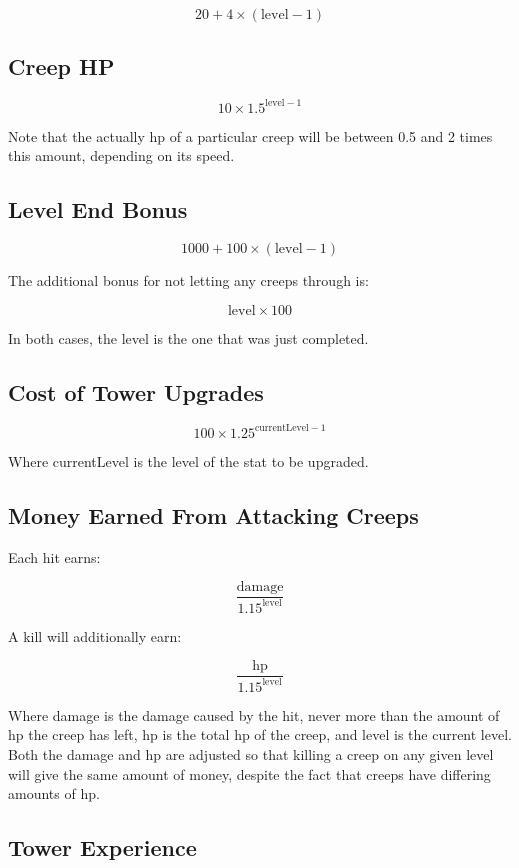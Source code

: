 \documentclass[a4paper,11pt]{article}
\begin{document}
\[20 + 4 \times \left( \mathrm{level} - 1 \right)\]

\subsection{Creep HP}

\[10 \times 1.5^{\mathrm{level} - 1}\]

Note that the actually hp of a particular creep will be between 0.5 and 2 times this amount, depending on its speed.

\subsection{Level End Bonus}

\[1000 + 100 \times \left( \mathrm{level} - 1 \right)\]

The additional bonus for not letting any creeps through is:

\[\mathrm{level} \times 100\]

In both cases, the level is the one that was just completed.

\subsection{Cost of Tower Upgrades}

\[100 \times 1.25^{\mathrm{currentLevel} - 1}\]

Where currentLevel is the level of the stat to be upgraded.

\subsection{Money Earned From Attacking Creeps}

Each hit earns:

\[\frac{\mathrm{damage}}{1.15^{\mathrm{level}}}\]

A kill will additionally earn:

\[\frac{\mathrm{hp}}{1.15^{\mathrm{level}}}\]

Where damage is the damage caused by the hit, never more than the amount of hp the creep has left, hp is the total hp of the creep, and level is the current level. Both the damage and hp are adjusted so that killing a creep on any given level will give the same amount of money, despite the fact that creeps have differing amounts of hp.

\subsection{Tower Experience}
\end{document}
